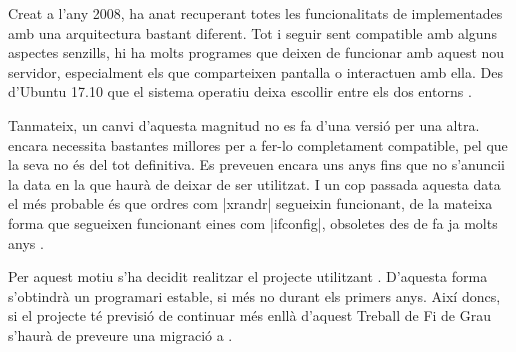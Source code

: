 Creat a l'any 2008, ha anat recuperant totes les funcionalitats de 
implementades amb una arquitectura bastant diferent. Tot i seguir sent
compatible amb alguns aspectes senzills, hi ha molts programes que deixen de
funcionar amb aquest nou servidor, especialment els que comparteixen pantalla
o interactuen amb ella. Des d'Ubuntu 17.10 que el sistema operatiu deixa
escollir entre els dos entorns \cite{Wayland}.

Tanmateix, un canvi d'aquesta magnitud no es fa d'una versió per una altra.
 encara necessita bastantes millores per a fer-lo completament
compatible, pel que la seva  no és del tot definitiva. Es preveuen
encara uns anys fins que no s'anuncii la data en la que  haurà de
deixar de ser utilitzat. I un cop passada aquesta data el més probable és que
ordres com \ord|xrandr| segueixin funcionant, de la mateixa forma que segueixen
funcionant eines com \ord|ifconfig|, obsoletes des de fa ja molts anys
\cite{Ifconfig}.

Per aquest motiu s'ha decidit realitzar el projecte utilitzant .
D'aquesta forma s'obtindrà un programari estable, si més no durant els primers
anys. Així doncs, si el projecte té previsió de continuar més enllà d'aquest
Treball de Fi de Grau s'haurà de preveure una migració a .
